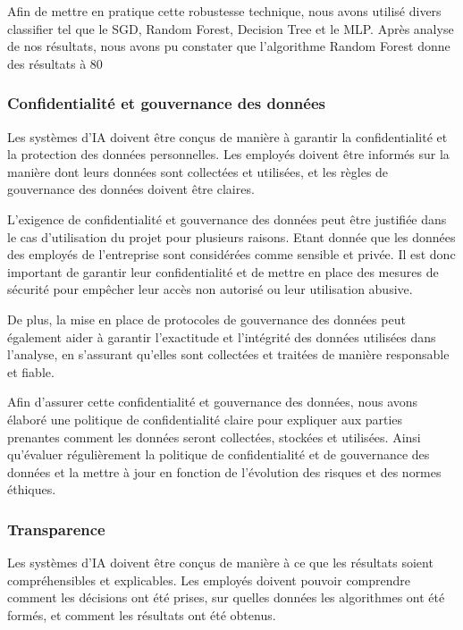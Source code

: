 Afin de mettre en pratique cette robustesse technique, nous avons utilisé divers classifier tel que le SGD, Random Forest, Decision Tree et le MLP. Après analyse de nos résultats, nous avons pu constater que l'algorithme Random Forest donne des résultats à 80 %

\newpage
\subsubsection{Confidentialité et gouvernance des données}
Les systèmes d'IA doivent être conçus de manière à garantir la confidentialité et la protection des données personnelles. Les employés doivent être informés sur la manière dont leurs données sont collectées et utilisées, et les règles de gouvernance des données doivent être claires. 

L'exigence de confidentialité et gouvernance des données peut être justifiée dans le cas d'utilisation du projet pour plusieurs raisons. Etant donnée que les données des employés de l'entreprise sont considérées comme sensible et privée. Il est donc important de garantir leur confidentialité et de mettre en place des mesures de sécurité pour empêcher leur accès non autorisé ou leur utilisation abusive. 

De plus, la mise en place de protocoles de gouvernance des données peut également aider à garantir l'exactitude et l'intégrité des données utilisées dans l'analyse, en s'assurant qu'elles sont collectées et traitées de manière responsable et fiable. 

Afin d'assurer cette confidentialité et gouvernance des données, nous avons élaboré une politique de confidentialité claire pour expliquer aux parties prenantes comment les données seront collectées, stockées et utilisées. Ainsi qu'évaluer régulièrement la politique de confidentialité et de gouvernance des données et la mettre à jour en fonction de l'évolution des risques et des normes éthiques. 

\subsubsection{Transparence}

Les systèmes d'IA doivent être conçus de manière à ce que les résultats soient compréhensibles et explicables. Les employés doivent pouvoir comprendre comment les décisions ont été prises, sur quelles données les algorithmes ont été formés, et comment les résultats ont été obtenus.  

